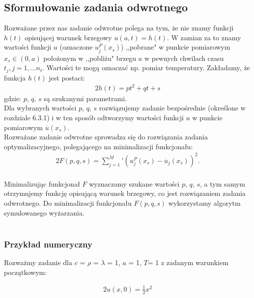 \documentclass[twoside]{projektInzynierskiMS1}
\newcommand{\newLine}{~\\}
\newcommand{\si}{ś}
\begin{document}
\subsection{Sformułowanie zadania odwrotnego}

Rozważane przez nas zadanie odwrotne polega na tym, że nie znamy funkcji $h(t)$ opisującej warunek brzegowy $u(a, t) = h(t)$.
W zamian za to znamy wartości funkcji $u$ (oznaczone $u^P_j(x_s)$) ,,pobrane" w punkcie pomiarowym $x_s \in (0, a)$
położonym w ,,pobliżu" brzegu $a$ w pewnych chwilach czasu $t_j, j = 1, ... n_t$. Wartości te mogą oznaczać np. pomiar temperatury.
Zakładamy, że funkcja $h(t)$ jest postaci: \\
\begin{alignat*}{2}
h(t) = pt^2 +qt  + s
\end{alignat*}
gdzie: $p$, $q$, $s$ są szukanymi parametrami. \\

Dla wybranych wartości $p$, $q$, $s$ rozwiązujemy zadanie bezpośrednie (okre\si lone w rozdziale 6.3.1) i w ten sposób odtworzymy wartości funkcji $u$ w punkcie pomiarowym $\overline u (x_s)$. \\


Rozważane zadanie odwrotne sprowadza się do rozwiązania zadania optymalizacyjnego, polegającego na minimalizacji funkcjonału:
\begin{alignat*}{2}
F(p, q, s) = \sum_{j=1}^M\prime \left(u^P_j (x_s) - \overline u_j (x_s)\right)^2.\\
\end{alignat*}

Minimalizując funkcjonał $F$ wyznaczamy szukane wartości $p$, $q$, $s$, a tym samym otrzymujemy funkcję opisującą warunek brzegowy, co jest rozwiązaniem zadania odwrotnego.
Do minimalizacji funkcjonału $F(p, q, s)$ wykorzystamy algorytm symulowanego wyżarzania. \\ \newLine


\subsubsection{Przykład numeryczny}

Rozważmy zadanie dla $c$ = $\rho$ = $\lambda$ = 1, $a$ = 1, $T$= 1 z zadanym warunkiem początkowym:

\begin{alignat*}{2}
u(x, 0) = \frac{1}{2} x^2\\
\end{alignat*}
\end{document}
